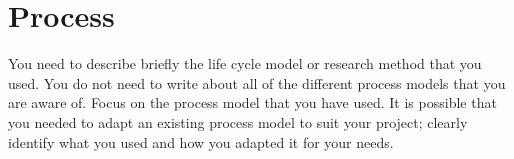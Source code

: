 \section{Process}
You need to describe briefly the life cycle model or research method that you used. You do not need to write about all of the different process models that you are aware of. Focus on the process model that you have used. It is possible that you needed to adapt an existing process model to suit your project; clearly identify what you used and how you adapted it for your needs.


